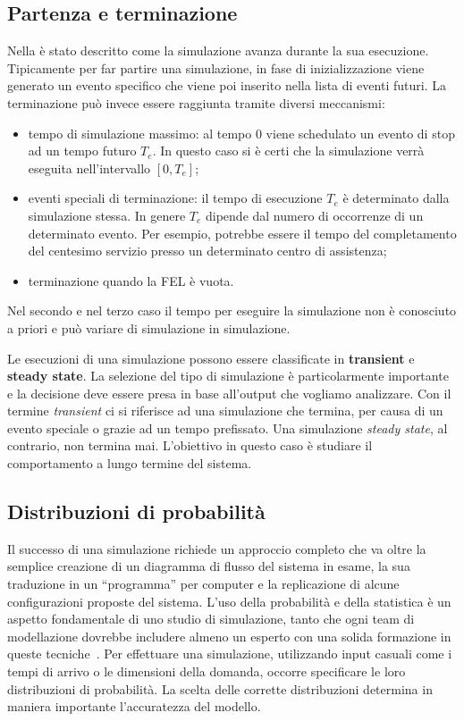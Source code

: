 \documentclass[12pt,a4paper,openright,twoside]{book}
\begin{document}
\subsection{Partenza e terminazione}
Nella  è stato descritto come la simulazione avanza durante la sua esecuzione. Tipicamente per far partire una simulazione, in fase di inizializzazione viene generato un evento specifico che viene poi inserito nella lista di eventi futuri. 
La terminazione può invece essere raggiunta tramite diversi meccanismi: 
\begin{itemize}
    \item tempo di simulazione massimo: al tempo 0 viene schedulato un evento di stop ad un tempo futuro $T_e$. In questo caso si è certi che la simulazione verrà eseguita nell'intervallo $[0, T_e]$; 
    \item eventi speciali di terminazione: il tempo di esecuzione $T_e$ è determinato dalla simulazione stessa. In genere $T_e$ dipende dal numero di occorrenze di un determinato evento. Per esempio, potrebbe essere il tempo del completamento del centesimo servizio presso un determinato centro di assistenza;  
    \item terminazione quando la FEL è vuota.
\end{itemize}
Nel secondo e nel terzo caso il tempo per eseguire la simulazione non è conosciuto a priori e può variare di simulazione in simulazione.

Le esecuzioni di una simulazione possono essere classificate in \textbf{transient} e \textbf{steady state}. La selezione del tipo di simulazione è particolarmente importante e la decisione deve essere presa in base all'output che vogliamo analizzare. Con il termine \textit{transient} ci si riferisce ad una simulazione che termina, per causa di un evento speciale o grazie ad un tempo prefissato. 
Una simulazione \textit{steady state}, al contrario, non termina mai. L'obiettivo in questo caso è studiare il comportamento a lungo termine del sistema. 

\subsection{Distribuzioni di probabilità}
Il successo di una simulazione richiede un approccio completo che va oltre la semplice creazione di un diagramma di flusso del sistema in esame, la sua traduzione in un ``programma'' per computer e la replicazione di alcune configurazioni proposte del sistema. L'uso della probabilità e della statistica è un aspetto fondamentale di uno studio di simulazione, tanto che ogni team di modellazione dovrebbe includere almeno un esperto con una solida formazione in queste tecniche~\cite{Law15}.
Per effettuare una simulazione, utilizzando input casuali come i tempi di arrivo o le dimensioni della domanda, occorre specificare le loro distribuzioni di probabilità. La scelta delle corrette distribuzioni determina in maniera importante l'accuratezza del modello. 
\end{document}
